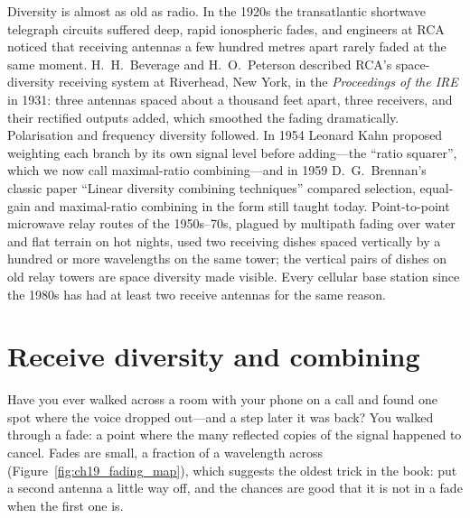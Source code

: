 \begin{history}
Diversity is almost as old as radio. In the 1920s the transatlantic shortwave telegraph circuits
suffered deep, rapid ionospheric fades, and engineers at RCA noticed that receiving antennas a few
hundred metres apart rarely faded at the same moment. H.~H.~Beverage and H.~O.~Peterson described
RCA's space-diversity receiving system at Riverhead, New York, in the \emph{Proceedings of the
IRE} in 1931: three antennas spaced about a thousand feet apart, three receivers, and their
rectified outputs added, which smoothed the fading dramatically. Polarisation and frequency
diversity followed. In 1954 Leonard Kahn proposed weighting each branch by its own signal level
before adding---the ``ratio squarer'', which we now call maximal-ratio combining---and in 1959
D.~G.~Brennan's classic paper ``Linear diversity combining techniques'' compared selection,
equal-gain and maximal-ratio combining in the form still taught today. Point-to-point microwave
relay routes of the 1950s--70s, plagued by multipath fading over water and flat terrain on hot
nights, used two receiving dishes spaced vertically by a hundred or more wavelengths on the same
tower; the vertical pairs of dishes on old relay towers are space diversity made visible. Every
cellular base station since the 1980s has had at least two receive antennas for the same reason.
\end{history}


\section{Receive diversity and combining}
\label{sec:ch19:combining}

Have you ever walked across a room with your phone on a call and found one spot where the voice
dropped out---and a step later it was back? You walked through a fade: a point where the many
reflected copies of the signal happened to cancel. Fades are small, a fraction of a wavelength
across (Figure~\ref{fig:ch19_fading_map}), which suggests the oldest trick in the book: put a second
antenna a little way off, and the chances are good that it is not in a fade when the first one is.

